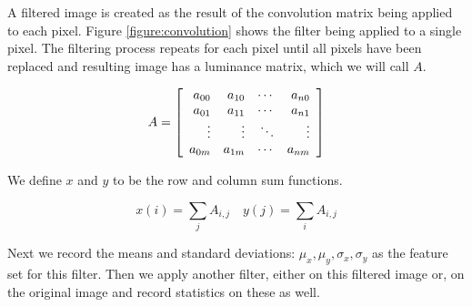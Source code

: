 A filtered image is created as the result of the convolution matrix being
applied to each pixel. Figure \ref{figure:convolution} shows the filter being
applied to a single pixel. The filtering process repeats for each pixel until
all pixels have been replaced and resulting image has a luminance matrix,
which we will call $A$.

\[A = \left [
    \begin{array}{r r r r}
        a_{00} & a_{10} & \cdots & a_{n0} \\
        a_{01} & a_{11} & \cdots & a_{n1}\\
        \vdots  & \vdots  & \ddots & \vdots\\
        a_{0m} & a_{1m} & \cdots & a_{nm}\\
    \end{array}
\right ] \]

We define $x$ and $y$ to be the row and column sum functions.

\[
x(i) = \sum_{j}{A_{i,j}} \quad
y(j) = \sum_{i}{A_{i,j}}
\]

Next we record the means and standard deviations: $\mu_x, \mu_y, \sigma_x,
\sigma_y$ as the feature set for this filter. Then we apply another
filter, either on this filtered image or, on the original image and record
statistics on these as well.

